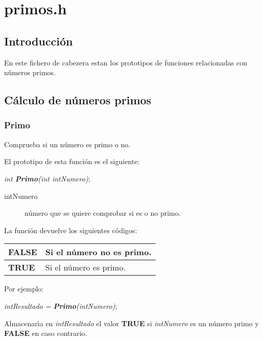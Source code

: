 %
%

\chapter{primos.h}

\section{Introducci\'on}
En este fichero de cabezera estan los prototipos de funciones relacionadas
con n\'umeros primos. 

\section{C\'alculo de n\'umeros primos}

\subsection{Primo}
Comprueba si un n\'umero es primo o no.\newline

El prototipo de esta funci\'on es el siguiente:

\begin{center}
\emph{int \textbf{Primo}(int intNumero)};
\end{center}

\begin{description}
\item[intNumero] n\'umero que se quiere comprobar si es o no primo.
\end{description}

La funci\'on devuelve los siguientes c\'odigos:

\begin{center}
\begin{tabular}{|l|l|}
\hline
\textbf{FALSE} & Si el n\'umero no es primo. \\
\hline
\textbf{TRUE} & Si el n\'umero es primo. \\
\hline
\end{tabular}
\end{center}

\par Por ejemplo:

\begin{center}
\emph{intResultado = \textbf{Primo}(intNumero)};
\end{center}

Almacenar\'{\i}a en \emph{intResultado} el valor \textbf{TRUE} si
\emph{intNumero} es un n\'umero primo y \textbf{FALSE} en caso contrario.

